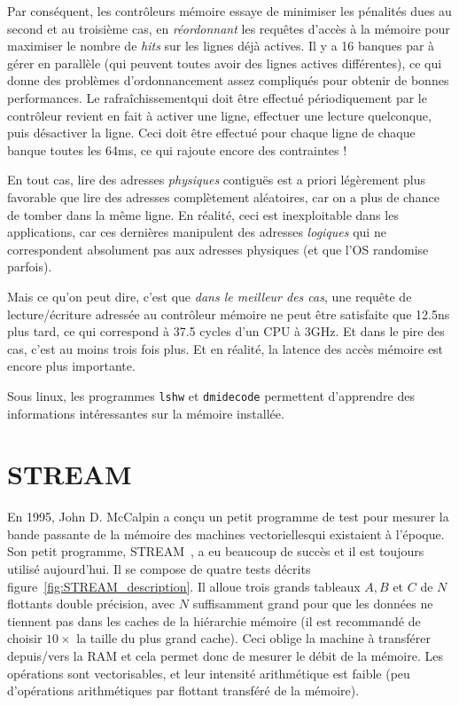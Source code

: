 \medskip

Par conséquent, les contrôleurs mémoire essaye de minimiser les pénalités dues
au second et au troisième cas, en \emph{réordonnant} les requêtes d'accès à la
mémoire pour maximiser le nombre de \emph{hits} sur les lignes déjà actives. Il
y a 16 banques par  à gérer en parallèle (qui peuvent toutes
avoir des lignes actives différentes), ce qui donne des problèmes
d'ordonnancement assez compliqués pour obtenir de bonnes performances.  Le \og
rafraîchissement\fg qui doit être effectué périodiquement par le contrôleur
revient en fait à activer une ligne, effectuer une lecture quelconque, puis
désactiver la ligne. Ceci doit être effectué pour chaque ligne de chaque banque
toutes les 64ms, ce qui rajoute encore des contraintes !

En tout cas, lire des adresses \emph{physiques} contiguës est a priori
légèrement plus favorable que lire des adresses complètement aléatoires, car on
a plus de chance de tomber dans la même ligne. En réalité, ceci est
inexploitable dans les applications, car ces dernières manipulent des adresses
\emph{logiques} qui ne correspondent absolument pas aux adresses physiques (et
que l'OS randomise parfois).

Mais ce qu'on peut dire, c'est que \emph{dans le meilleur des cas}, une requête
de lecture/écriture adressée au contrôleur mémoire ne peut être satisfaite que
12.5ns plus tard, ce qui correspond à 37.5 cycles d'un CPU à 3GHz. Et dans le
pire des cas, c'est au moins trois fois plus. Et en réalité, la latence des
accès mémoire est encore plus importante.

Sous linux, les programmes \texttt{lshw} et \texttt{dmidecode} permettent
d'apprendre des informations intéressantes sur la mémoire installée.

\section{\textsf{STREAM}}

En 1995, John D. McCalpin a conçu un petit programme de test pour mesurer la
bande passante de la mémoire des machines \og vectorielles\fg qui existaient à
l'époque. Son petit programme, \textsf{STREAM}~\cite{McCalpin1995}, a eu
beaucoup de succès et il est toujours utilisé aujourd'hui. Il se compose de
quatre tests décrits figure~\ref{fig:STREAM_description}. Il alloue trois grands
tableaux $A, B$ et $C$ de $N$ flottants double précision, avec $N$ suffisamment
grand pour que les données ne tiennent pas dans les caches de la hiérarchie
mémoire (il est recommandé de choisir $10\times$ la taille du plus grand
cache). Ceci oblige la machine à transférer depuis/vers la RAM et cela permet
donc de mesurer le débit de la mémoire. Les opérations sont vectorisables, et
leur intensité arithmétique est faible (peu d'opérations arithmétiques par
flottant transféré de la mémoire).

